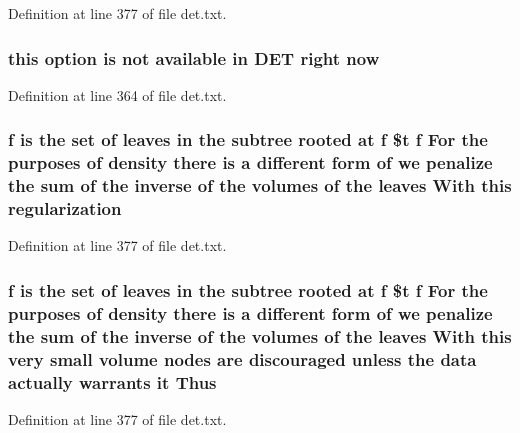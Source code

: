 Definition at line 377 of file det.\-txt.

\subsubsection[{now}]{\setlength{\rightskip}{0pt plus 5cm}this option is not available in D\-E\-T right now}\label{det_8txt_a1f596a62bceac17014e1dd335b8f3e10}


Definition at line 364 of file det.\-txt.

\subsubsection[{regularization}]{\setlength{\rightskip}{0pt plus 5cm}f is the {\bf set} of leaves in the subtree rooted at f \$t f For the purposes of density there is a different form of we penalize the sum of the inverse of the volumes of the leaves With this regularization}\label{det_8txt_a9cca165c3a05514453c6f5a747aa57ca}


Definition at line 377 of file det.\-txt.

\subsubsection[{Thus}]{\setlength{\rightskip}{0pt plus 5cm}f is the {\bf set} of leaves in the subtree rooted at f \$t f For the purposes of density there is a different form of we penalize the sum of the inverse of the volumes of the leaves With this very small volume nodes are discouraged unless the data actually warrants it Thus}\label{det_8txt_aab20f71ea7429d20011eee9f68ef7d1d}


Definition at line 377 of file det.\-txt.

